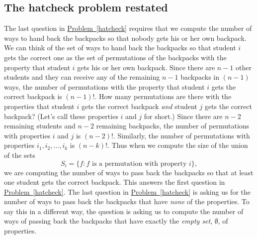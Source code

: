 \documentclass[10pt,]{book}
\theoremstyle{plain}
\theoremstyle{definition}
\numberwithin{equation}{chapter}
\begin{document}
\subsection[{The hatcheck problem restated}]{The hatcheck problem restated}\label{subsection-52}
The last question in \hyperref[hatcheck]{Problem~\ref{hatcheck}} requires that we compute the number of ways to hand back the backpacks so that nobody gets his or her own backpack. We can think of the set of ways to hand back the backpacks so that student \(i\) gets the correct one as the set of permutations of the backpacks with the property that student \(i\) gets his or her own backpack. Since there are \(n-1\) other students and they can receive any of the remaining \(n-1\) backpacks in \((n-1)\) ways, the number of permutations with the property that student \(i\) gets the correct backpack is \((n-1)!\). How many permutations are there with the properties that student \(i\) gets the correct backpack \emph{and} student \(j\) gets the correct backpack? (Let's call these properties \(i\) and \(j\) for short.) Since there are \(n-2\) remaining students and \(n-2\) remaining backpacks, the number of permutations with properties \(i\) and \(j\) is \((n-2)!\). Similarly, the number of permutations with properties \(i_1,i_2,\ldots,i_k\) is \((n-k)!\). Thus when we compute the size of the union of the sets%
\begin{equation*}
S_i=\{f: f\mbox{ is a permutation with property } i\},
\end{equation*}
we are computing the number of ways to pass back the backpacks so that at least one student gets the correct backpack. This answers the first question in \hyperref[hatcheck]{Problem~\ref{hatcheck}}. The last question in \hyperref[hatcheck]{Problem~\ref{hatcheck}} is asking us for the number of ways to pass back the backpacks that have \emph{none} of the properties. To say this in a different way, the question is asking us to compute the number of ways of passing back the backpacks that have exactly the \emph{empty set}, \(\emptyset\), of properties.%
\typeout{************************************************}
\typeout{************************************************}
\end{document}
